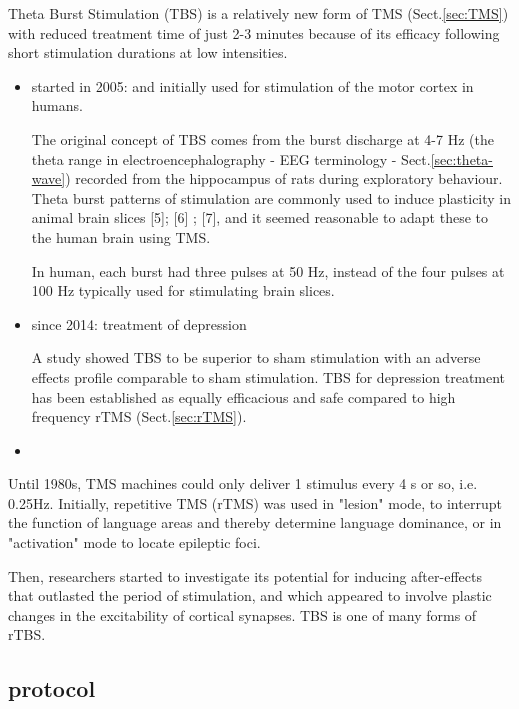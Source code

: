 Theta Burst Stimulation (TBS) is a relatively new form of TMS
(Sect.\ref{sec:TMS}) with reduced treatment time of just 2-3 minutes
because of its efficacy following short stimulation durations at low
intensities.

\begin{itemize}
  \item started in 2005:  and initially used for stimulation of the motor cortex
  in humans.
  
  The original concept of TBS comes from the burst discharge at 4-7 Hz (the
  theta range in electroencephalography - EEG terminology - Sect.\ref{sec:theta-wave})
  recorded from the hippocampus of rats during exploratory behaviour.
  Theta burst patterns of stimulation are commonly used to induce plasticity in
  animal brain slices [5]; [6] ;  [7], and it seemed reasonable to adapt these
  to the human brain using TMS.
  
  In human, each burst had three pulses at 50 Hz, instead of the four pulses at
  100 Hz typically used for stimulating brain slices.
  
  \item since 2014: treatment of depression 
  
  A study showed TBS to be superior to sham stimulation with an adverse effects
  profile comparable to sham stimulation.
  TBS for depression treatment has been established as equally efficacious and
  safe compared to high frequency rTMS (Sect.\ref{sec:rTMS}). 
  
  \item 
\end{itemize}

\begin{mdframed}
Until 1980s, TMS machines could only deliver 1 stimulus every 4 s or so, i.e.
0.25Hz. Initially, repetitive TMS (rTMS) was used in "lesion" mode, to interrupt
the function of language areas and thereby determine language dominance, or in
"activation" mode to locate epileptic foci.

Then, researchers started to investigate its potential for inducing
after-effects that outlasted the period of stimulation, and which appeared to
involve plastic changes in the excitability of cortical synapses. TBS is one of
many forms of rTBS.
\end{mdframed}

\subsection{protocol}
\label{sec:TBS-protocol}

